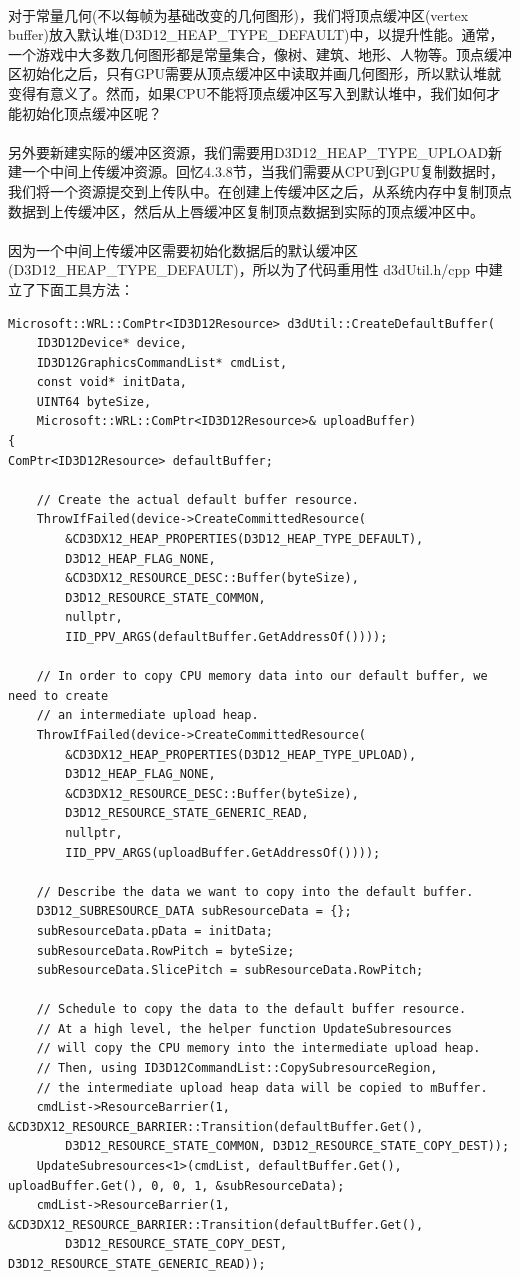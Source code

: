 \documentclass[11pt,a4paper,oldfontcommands]{memoir}
\begin{document}
{\begin{flushleft}
~\\
对于常量几何(不以每帧为基础改变的几何图形)，我们将顶点缓冲区(vertex buffer)放入默认堆(D3D12\_HEAP\_TYPE\_DEFAULT)中，以提升性能。通常，一个游戏中大多数几何图形都是常量集合，像树、建筑、地形、人物等。顶点缓冲区初始化之后，只有GPU需要从顶点缓冲区中读取并画几何图形，所以默认堆就变得有意义了。然而，如果CPU不能将顶点缓冲区写入到默认堆中，我们如何才能初始化顶点缓冲区呢？\\
~\\
另外要新建实际的缓冲区资源，我们需要用D3D12\_HEAP\_TYPE\_UPLOAD新建一个中间上传缓冲资源。回忆4.3.8节，当我们需要从CPU到GPU复制数据时，我们将一个资源提交到上传队中。在创建上传缓冲区之后，从系统内存中复制顶点数据到上传缓冲区，然后从上唇缓冲区复制顶点数据到实际的顶点缓冲区中。\\
~\\
因为一个中间上传缓冲区需要初始化数据后的默认缓冲区(D3D12\_HEAP\_TYPE\_DEFAULT)，所以为了代码重用性 d3dUtil.h/cpp 中建立了下面工具方法：
\begin{lstlisting}
Microsoft::WRL::ComPtr<ID3D12Resource> d3dUtil::CreateDefaultBuffer(
    ID3D12Device* device,
    ID3D12GraphicsCommandList* cmdList,
    const void* initData,
    UINT64 byteSize,
    Microsoft::WRL::ComPtr<ID3D12Resource>& uploadBuffer)
{
ComPtr<ID3D12Resource> defaultBuffer;

    // Create the actual default buffer resource.
    ThrowIfFailed(device->CreateCommittedResource(
        &CD3DX12_HEAP_PROPERTIES(D3D12_HEAP_TYPE_DEFAULT),
        D3D12_HEAP_FLAG_NONE,
        &CD3DX12_RESOURCE_DESC::Buffer(byteSize),
        D3D12_RESOURCE_STATE_COMMON,
        nullptr,
        IID_PPV_ARGS(defaultBuffer.GetAddressOf())));

    // In order to copy CPU memory data into our default buffer, we need to create
    // an intermediate upload heap. 
    ThrowIfFailed(device->CreateCommittedResource(
        &CD3DX12_HEAP_PROPERTIES(D3D12_HEAP_TYPE_UPLOAD),
        D3D12_HEAP_FLAG_NONE,
        &CD3DX12_RESOURCE_DESC::Buffer(byteSize),
        D3D12_RESOURCE_STATE_GENERIC_READ,
        nullptr,
        IID_PPV_ARGS(uploadBuffer.GetAddressOf())));

    // Describe the data we want to copy into the default buffer.
    D3D12_SUBRESOURCE_DATA subResourceData = {};
    subResourceData.pData = initData;
    subResourceData.RowPitch = byteSize;
    subResourceData.SlicePitch = subResourceData.RowPitch;

    // Schedule to copy the data to the default buffer resource.  
    // At a high level, the helper function UpdateSubresources
    // will copy the CPU memory into the intermediate upload heap.  
    // Then, using ID3D12CommandList::CopySubresourceRegion,
    // the intermediate upload heap data will be copied to mBuffer.
    cmdList->ResourceBarrier(1, &CD3DX12_RESOURCE_BARRIER::Transition(defaultBuffer.Get(), 
        D3D12_RESOURCE_STATE_COMMON, D3D12_RESOURCE_STATE_COPY_DEST));
    UpdateSubresources<1>(cmdList, defaultBuffer.Get(), uploadBuffer.Get(), 0, 0, 1, &subResourceData);
    cmdList->ResourceBarrier(1, &CD3DX12_RESOURCE_BARRIER::Transition(defaultBuffer.Get(),
        D3D12_RESOURCE_STATE_COPY_DEST, D3D12_RESOURCE_STATE_GENERIC_READ));


\end{lstlisting}
\end{flushleft}}
\end{document}
